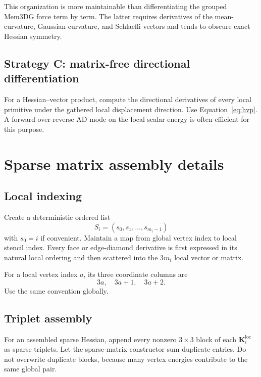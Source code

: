 \documentclass[11pt]{article}
\newcommand{\Kmat}{\mathbf{K}}
\begin{document}
This organization is more maintainable than differentiating the grouped Mem3DG force term by term.  The latter requires derivatives of the mean-curvature, Gaussian-curvature, and Schlaefli vectors and tends to obscure exact Hessian symmetry.

\subsection{Strategy C: matrix-free directional differentiation}

For a Hessian--vector product, compute the directional derivatives of every local primitive under the gathered local displacement direction.  Use Equation~\eqref{eq:hvp}.  A forward-over-reverse AD mode on the local scalar energy is often efficient for this purpose.

\section{Sparse matrix assembly details}

\subsection{Local indexing}

Create a deterministic ordered list
\begin{equation}
  S_i=(s_0,s_1,\ldots,s_{m_i-1})
\end{equation}
with $s_0=i$ if convenient.  Maintain a map from global vertex index to local stencil index.  Every face or edge-diamond derivative is first expressed in its natural local ordering and then scattered into the $3m_i$ local vector or matrix.

For a local vertex index $a$, its three coordinate columns are
\begin{equation}
  3a,
  \quad 3a+1,
  \quad 3a+2.
\end{equation}
Use the same convention globally.

\subsection{Triplet assembly}

For an assembled sparse Hessian, append every nonzero $3\times3$ block of each $\Kmat_i^{\mathrm{loc}}$ as sparse triplets.  Let the sparse-matrix constructor sum duplicate entries.  Do not overwrite duplicate blocks, because many vertex energies contribute to the same global pair.
\end{document}
